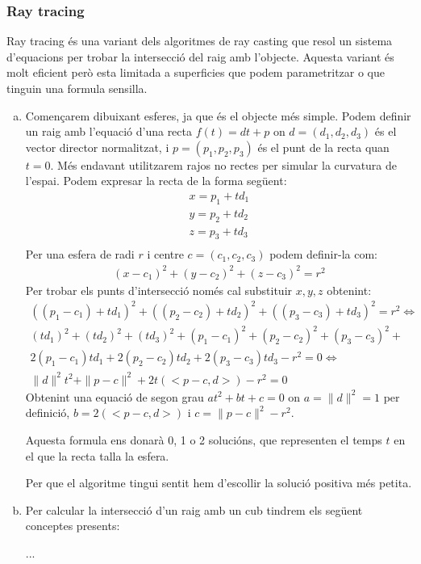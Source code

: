 \documentclass{article}
\begin{document}
\subsubsection{Ray tracing}
Ray tracing és una variant dels algoritmes de ray casting que resol un sistema d'equacions per trobar la intersecció del raig amb
l'objecte. Aquesta variant és molt eficient però esta limitada a superficies que podem parametritzar o que tinguin una formula
sensilla.
\begin{enumerate}[a)]
   \item Començarem dibuixant esferes, ja que és el objecte més simple.
  Podem definir un raig amb l'equació d'una recta $f(t)=dt+p$ on $d=(d_1,d_2,d_3)$ és el vector director normalitzat, i $p=(p_1,p_2,p_3)$ és
  el punt de la recta quan $t=0$. Més endavant utilitzarem rajos no rectes per simular la curvatura de l'espai.
  Podem expresar la recta de la forma següent:
\begin{align*}
x=p_1+td_1 \\
y=p_2+td_2 \\
z=p_3+td_3 \\
\end{align*}
Per una esfera de radi $r$ i centre  $c=(c_1,c_2,c_3)$ podem definir-la com:
\begin{align*}
   (x-c_1)^2+(y-c_2)^2 +(z-c_3)^2 =r^2
\end{align*}
Per trobar els punts d'intersecció només cal substituir $x,y,z$ obtenint:
 \begin{align*}
   ((p_1-c_1)+td_1)^2 + ((p_2-c_2)+td_2)^2+((p_3-c_3)+td_3)^2= r^2  \iff \\
   (td_1)^2+(td_2)^2+(td_3)^2+ (p_1-c_1)^2+(p_2-c_2)^2+(p_3-c_3)^2+\\ 2(p_1-c_1)td_1+2(p_2-c_2)td_2+2(p_3-c_3)td_3 -r^2=0  \iff\\
   \|d\|^2t^2 + \|p-c\|^2+2t(<p-c,d>) -r^2=0
\end{align*}
Obtenint una equació de segon grau $at^2+bt+c=0$ on $a= \|d\|^2 =1$ per definició, $b=2(<p-c,d>)$ i  $c=\|p-c\|^2-r^2$. 

Aquesta formula ens donarà 0, 1 o 2 solucións, que representen el temps $t$ en el que la recta talla la esfera.

Per que el algoritme tingui sentit hem d'escollir la solució positiva més petita.
\item Per calcular la intersecció d'un raig amb un cub tindrem els següent conceptes presents:


   ...
\end{enumerate}
\end{document}
